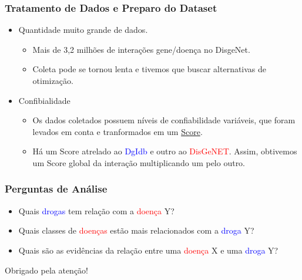 \documentclass[12pt]{beamer}
\begin{document}
\begin{frame}
  \frametitle{Tratamento de Dados e Preparo do Dataset}

  \begin{itemize}
    \item Quantidade muito grande de dados.
          \begin{itemize}
            \item Mais de 3,2 milhões de interações gene/doença no DisgeNet.
            \item Coleta pode se tornou lenta e tivemos que buscar alternativas de otimização.
          \end{itemize}
    \item Confibialidade
          \begin{itemize}
            \item Os dados coletados possuem níveis de confiabilidade
                  variáveis, que foram levados em conta e tranformados em um \underline{Score}.
            \item Há um Score atrelado ao \textcolor{blue}{DgIdb} e outro ao \textcolor{red}{DisGeNET}. Assim, obtivemos um Score global da interação multiplicando um pelo outro.      
          \end{itemize}
  \end{itemize}
\end{frame}

\begin{frame}
  \frametitle{Perguntas de Análise}

  \begin{itemize}
    \item Quais \textcolor{blue}{drogas} tem relação com a \textcolor{red}{doença} Y?
          \vspace{10pt}
    \item Quais classes de \textcolor{red}{doenças} estão mais relacionados com a \textcolor{blue}{droga} Y? 
          \vspace{10pt}
    \item Quais são as evidências da relação entre uma \textcolor{red}{doença} X e uma \textcolor{blue}{droga} Y?
          
  \end{itemize}
\end{frame}

\begin{frame}
  \centering Obrigado pela atenção!
\end{frame}
\end{document}
